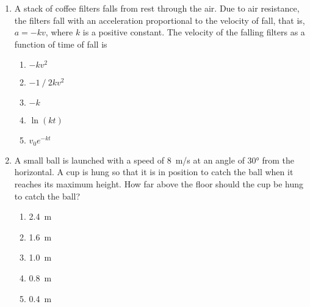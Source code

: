 \documentclass{../../../oss-classkick}
\begin{document}
\begin{multicols*}{2}
\begin{enumerate}[resume,leftmargin=18pt]
  \item A stack of coffee filters falls from rest through the air. Due to air
    resistance, the filters fall with an acceleration proportional to the
    velocity of fall, that is, $a=-kv$, where $k$ is a positive constant. The
    velocity of the falling filters as a function of time of fall is
    \begin{enumerate}[nosep,leftmargin=18pt,label=(\Alph*)]
    \item $-kv^2$
    \item $-1⁄2kv^2$
    \item $-k$
    \item $\ln(kt)$
    \item $v_0e^{-kt}$
    \end{enumerate}
    
  \item A small ball is launched with a speed of \SI{8}{m/s} at an angle of
    \ang{30} from the horizontal. A cup is hung so that it is in position to
    catch the ball when it reaches its maximum height. How far above the floor
    should the cup be hung to catch the ball?    

    \begin{enumerate}[nosep,leftmargin=18pt,label=(\Alph*)]
    \item\SI{2.4}{\metre}
    \item\SI{1.6}{\metre}
    \item\SI{1.0}{\metre}
    \item\SI{.8}{\metre}
    \item\SI{.4}{\metre}
    \end{enumerate}


\end{enumerate}
\end{multicols*}
\end{document}
